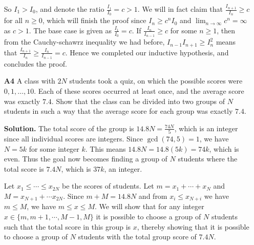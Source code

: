\documentclass[11pt,a4paper]{article}
\newcommand{\<}{\langle}
\renewcommand{\>}{\rangle}
\begin{document}
\begin{enumerate}
So $I_1>I_0$, and denote the ratio $\frac{I_1}{I_0}=c>1$. We will in fact claim that $\frac{I_{n+1}}{I_n}\ge c$ for all $n\ge 0$, which will finish the proof since $I_n\ge c^nI_0$ and $\lim_{n\to\infty}c^n=\infty$ as $c>1$. The base case is given as $\frac{I_1}{I_0}=c$. If $\frac{I_{n}}{I_{n-1}}\ge c$ for some $n\ge 1$, then from the Cauchy-schawrz inequality we had before, $I_{n-1}I_{n+1}\ge I_n^2$ means that $\frac{I_{n+1}}{I_n}\ge \frac{I_n}{I_{n-1}}=c$. Hence we completed our inductive hypothesis, and concludes the proof. 

\item[\textbf{A4}] A class with $2N$ students took a quiz, on which the possible scores were $0,1,\dots,10.$ Each of these scores occurred at least once, and the average score was exactly $7.4.$ Show that the class can be divided into two groups of $N$ students in such a way that the average score for each group was exactly $7.4.$

\textbf{Solution.} The total score of the group is $14.8N=\frac{74N}{5}$, which is an integer since all individual scores are integers. Since $\gcd(74, 5)=1$, we have $N=5k$ for some integer $k$. This means $14.8N=14.8(5k)=74k$, which is even. Thus the goal now becomes finding a group of $N$ students where the total score is $7.4N$, which is $37k$, an integer. 

Let $x_1\le\cdots\le x_{2N}$ be the scores of students. Let $m=x_1+\cdots + x_N$ and $M=x_{N+1}+\cdots x_{2N}$. Since $m+M=14.8N$ and from $x_i\le x_{N+i}$ we have $m\le M$, we have $m\le x\le M$. We will show that for any integer $x\in \{m, m+1, \cdots , M-1, M\}$ it is possible to choose a group of $N$ students such that the total score in this group is $x$, thereby showing that it is possible to choose a group of $N$ students with the total group score of $7.4N$. 


\end{enumerate}
\end{document}

